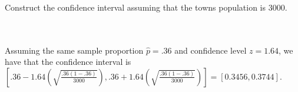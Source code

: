 Construct the confidence interval assuming that the towns population is 3000.\\\\

\begin{solution}\renewcommand{\qedsymbol}{}\ \\
    Assuming the same sample proportion $\hat{p}=.36$ and confidence level $z=1.64$, we have that the
    confidence interval is
    $[.36-1.64(\sqrt{\frac{.36(1-.36)}{3000}}),.36+1.64(\sqrt{\frac{.36(1-.36)}{3000}})]=
    [0.3456,0.3744]$.

\end{solution}